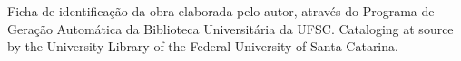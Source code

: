 \begin{fichacatalografica}
    \vspace*{\fill}

    \begin{center}

        \lang
        {Ficha de identificação da obra elaborada pelo autor,
        através do Programa de Geração Automática da Biblioteca Universitária da UFSC.}
        {Cataloging at source by the University Library of the Federal University of Santa Catarina.}



    \end{center}

\end{fichacatalografica}

